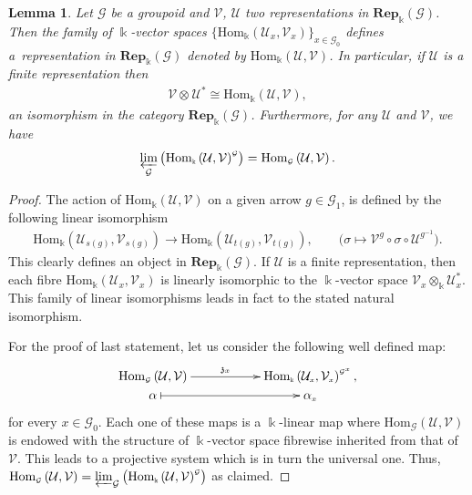 \documentclass[pdftex]{sigma}
\numberwithin{equation}{section}
\newtheorem{Lemma}[Theorem]{Lemma}
\newcommand{\tensor}[1]{\otimes_{\scriptscriptstyle{#1}}}
\newcommand{\fk}[1]{\mathfrak{#1}}
\renewcommand{\hom}[3]{\mathrm{Hom}_{\Sscript{#1}}\left(#2, #3\right)}
\newcommand{\Rep}[1]{\mathbf{Rep}_{\Sscript{\Bbbk}}(#1)}
\newcommand{\Go}{\cG_{\Sscript{0}}}
\newcommand{\Ga}{\cG_{\Sscript{1}}}
\newcommand{\Vx}{\cV_{\Sscript{x}}}
\newcommand{\Ux}{\cU_{\Sscript{x}}}
\newcommand{\Vg}{\cV^{\Sscript{g}}}
\newcommand{\Umg}{\cU^{\Sscript{g}^{-1}}}
\newcommand{\cG}{{\mathcal G}}
\newcommand{\cU}{{\mathcal U}}
\newcommand{\cV}{{\mathcal V}}
\newcommand{\Sscript}[1]{\scriptscriptstyle{#1}}
\newcommand{\prolimit}[2]{\varprojlim_{#1}\left({#2}\right)}
\begin{document}
\begin{Lemma}\label{lema:Hom}Let $\cG$ be a groupoid and $\cV$, $\cU$ two representations in $\Rep{\cG}$. Then the fa\-mily of $\Bbbk$-vector spaces $\big\{\hom{\Bbbk}{\Ux}{\Vx}\big\}_{x \in \Go }$ defines a~representation in $\Rep{\cG}$ denoted by $\hom{\Bbbk}{\cU}{\cV}$. In particular, if $\cU$ is a finite representation then
\begin{gather*}
\cV \tensor{} \cU^{*} \cong \hom{\Bbbk}{\cU}{\cV},
\end{gather*}
an isomorphism in the category $\Rep{\cG}$. Furthermore, for any $\cU$ and $\cV$, we have
\begin{gather*}
\prolimit{\cG}{\hom{\Bbbk}{\cU}{\cV}^{\Sscript{\cG}}} =\hom{\cG}{\cU}{\cV}.
\end{gather*}
\end{Lemma}
\begin{proof}The action of $\hom{\Bbbk}{\cU}{\cV}$ on a given arrow $g \in \Ga$, is defined by the following linear isomorphism
\begin{gather*}
\hom{\Bbbk}{\cU_{\Sscript{s(g)}}}{\cV_{\Sscript{s(g)}}}\longrightarrow \hom{\Bbbk}{\cU_{\Sscript{t(g)}}}{\cV_{\Sscript{t(g)}}}, \qquad \big( \sigma \longmapsto \Vg \circ \sigma \circ \Umg \big).
\end{gather*}
This clearly defines an object in $\Rep{\cG}$. If $\cU$ is a finite representation, then each fibre $\hom{\Bbbk}{\Ux}{\Vx}$ is linearly isomorphic to the $\Bbbk$-vector space $\Vx\tensor{\Bbbk}\Ux^*$. This family of linear isomorphisms leads in fact to the stated natural isomorphism.

For the proof of last statement, let us consider the following well defined map:
\begin{gather*}
\xymatrix@R=0pt{ \hom{\cG}{\cU}{\cV} \ar@{->}^-{\fk{z}_{\Sscript{x}} }[rr] & & \hom{\Bbbk}{\Ux}{\Vx}^{\Sscript{\cG^x}}, \\ \alpha \ar@{|->}^-{}[rr]
& & \alpha_{\Sscript{x}} }
\end{gather*}
for every $x \in \Go$. Each one of these maps is a $\Bbbk$-linear map where $\hom{\cG}{\cU}{\cV}$ is endowed with the structure of $\Bbbk$-vector space fibrewise inherited from that of $\cV$. This leads to a projective system which is in turn the universal one. Thus, $\hom{\cG}{\cU}{\cV}=\prolimit{\cG}{\hom{\Bbbk}{\cU}{\cV}^{\Sscript{\cG}}}$ as claimed.
\end{proof}
\end{document}
